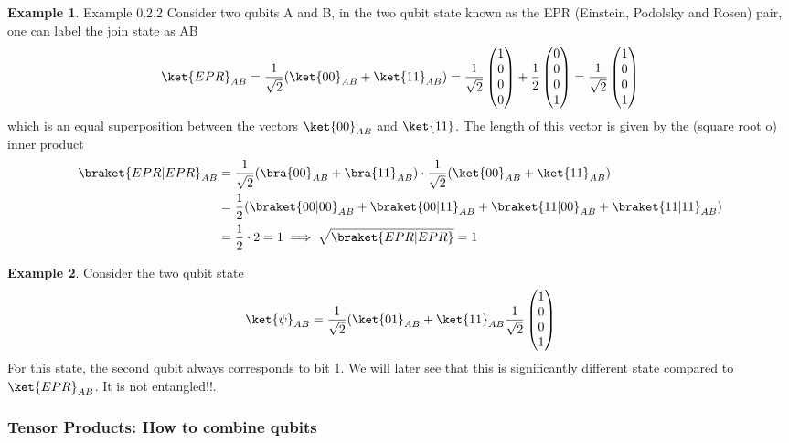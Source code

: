 \documentclass[12pt, oneside]{book}
\theoremstyle{definition}
\theoremstyle{definition}
\newtheorem{example}{Example}[section]
\theoremstyle{remark}
\begin{document}
\begin{example}
    Example 0.2.2 Consider two qubits A and B, in the two qubit state known as the EPR (Einstein, Podolsky and Rosen) pair, one can label the join state as AB
    \[
    \ket{EPR}_{AB}=\frac{1}{\sqrt{2}}(\ket{00}_{AB}+\ket{11}_{AB})=\frac{1}{\sqrt{2}}\begin{pmatrix} 1 \\ 0 \\ 0 \\ 0 \end{pmatrix} + \frac{1}{2}\begin{pmatrix} 0 \\ 0 \\ 0 \\ 1 \end{pmatrix}=\frac{1}{\sqrt{2}}\begin{pmatrix} 1 \\ 0 \\ 0 \\ 1 \end{pmatrix}
    \]
    which is an equal superposition between the vectors $\ket{00}_{AB}$ and $\ket{11}$. The length of this vector is given by the (square root o) inner product
    \begin{align*}
    \braket{EPR|EPR}_{AB}&=\frac{1}{\sqrt{2}}(\bra{00}_{AB}+\bra{11}_{AB})\cdot \frac{1}{\sqrt{2}}(\ket{00}_{AB}+\ket{11}_{AB})\\
    &=\frac{1}{2}(\braket{00|00}_{AB}+\braket{00|11}_{AB}+\braket{11|00}_{AB}+\braket{11|11}_{AB})\\
    &=\frac{1}{2}\cdot 2=1 \implies \sqrt{\braket{EPR|EPR}}=1
    \end{align*}
\end{example}
\begin{example}
    Consider the two qubit state
    \[
    \ket{\psi}_{AB}=\frac{1}{\sqrt{2}}(\ket{01}_{AB}+\ket{11}_{AB}\frac{1}{\sqrt{2}}\begin{pmatrix} 1\\ 0 \\ 0 \\ 1 \end{pmatrix}
    \]
    For this state, the second qubit always corresponds to bit 1. We will later see that this is significantly different state compared to $\ket{EPR}_{AB}$. It is not entangled!!.
\end{example}

\subsubsection{Tensor Products: How to combine qubits}
\end{document}
